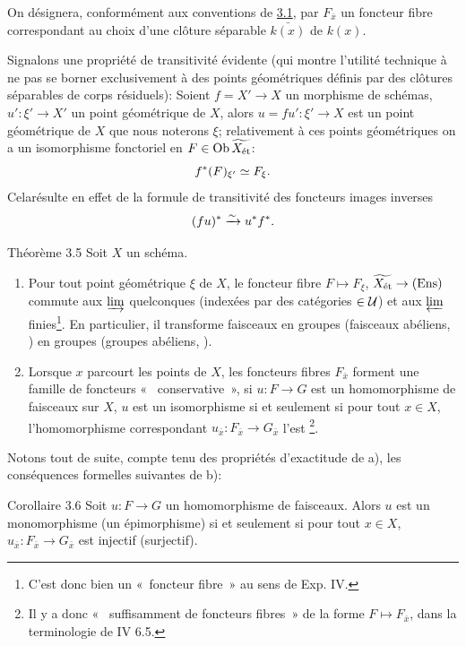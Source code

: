 \documentclass[10pt]{../fichiers-configuration-latex/smfart}
\begin{document}
On désignera, conformément aux conventions de \hyperref[VIII.subsec3.1]{3.1},
par $F_{\bar{x}}$
un foncteur fibre correspondant au choix d'une clôture séparable
$\bar{k(x)}$ de $k(x)$.

Signalons une propriété de transitivité évidente (qui montre l'utilité
technique à ne pas se borner exclusivement à des points géométriques
définis par des clôtures séparables de corps résiduels): Soient $f =
X'\to X$ un morphisme de schémas, $u' : \xi'\to X'$ un point
géométrique de $X$, alors $u = f u': \xi'\to X$ est un point
géométrique de $X$ que nous noterons $\xi$; relativement à ces points
géométriques on a un isomorphisme fonctoriel en $F \in \operatorname{Ob}
\widetilde{X_{\text{ét}}}$:
$$
f^{\ast} (F)_{\xi'} \simeq F_{\xi}{}.
$$
Cela\pageoriginale  résulte en effet de la formule de transitivité des
foncteurs
images inverses
$$
(fu)^{\ast} \xrightarrow{\sim} u^{\ast} f^{\ast}{}.
$$

\begin{enonce*}{Théorème 3.5}
Soit $X$ un schéma.
\begin{enumerate}
\renewcommand{\theenumi}{\alph{enumi}}
\renewcommand{\labelenumi}{\theenumi)}
\item Pour tout point géométrique $\xi$ de $X$, le foncteur fibre $F
  \mapsto F_{\xi}$, $\widetilde{X_{\text{\rm ét}}} \to (\Ens)$ commute aux
  $\varinjlim$ quelconques (indexées par des catégories $\in
  {\mathcal U}$) et aux $\varprojlim$ finies\footnote{C'est donc bien
  un « foncteur fibre » au sens de Exp. IV.}. En particulier, il
  transforme faisceaux en groupes (\resp faisceaux abéliens, \etc)
  en groupes (\resp groupes abéliens, \etc).

\item Lorsque $x$ parcourt les points de $X$, les foncteurs fibres
  $F_{\bar{x}}$ forment une famille de foncteurs «   conservative », \ie si $u : F \to G$ est un homomorphisme de
  faisceaux sur $X$, $u$ est un isomorphisme si et seulement si pour
  tout $x \in X$, l'homomorphisme correspondant $u_{\bar{x}} :
  F_{\bar{x}} \to G_{\bar{x}}$ l'est \footnote{Il y a donc «   suffisamment de foncteurs fibres » de la forme $F \mapsto
  F_{\bar{x}}$, dans la terminologie de IV 6.5.}.
\end{enumerate}
\end{enonce*}

Notons tout de suite, compte tenu des propriétés d'exactitude de a),
les conséquences formelles suivantes de b):

\begin{enonce*}{Corollaire 3.6}
Soit $u : F \to G$ un homomorphisme de faisceaux. Alors $u$ est un
monomorphisme (\resp un épimorphisme) si et seulement si pour tout $x
\in X$, $u_{\bar{x}}:F_{\bar{x}}\to G_{\bar{x}}$ est injectif
(\resp surjectif).
\end{enonce*}
\end{document}
